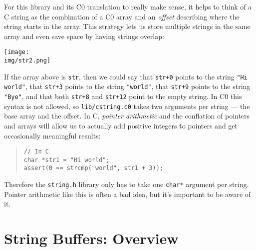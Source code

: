 \documentclass[12pt]{exam}
\begin{document}
For this library and its C0 translation to really make sense, it helps
to think of a C string as the combination of a C0 array and an
\emph{offset} describing where the string starts in the array. This
strategy lets us store multiple strings in the same array and even
save space by having strings overlap:
\begin{center}
\texttt{[image: \\img/str2.png]}
\end{center}
If the array above is \lstinline'str', then we could say that
\lstinline'str+0' points to the string \lstinline'"Hi world"', that
\lstinline'str+3' points to the string \lstinline'"world"', that
\lstinline'str+9' points to the string \lstinline'"Bye"', and that
both \lstinline'str+8' and \lstinline'str+12' point to the empty
string. In C0 this syntax is not allowed, so
\lstinline'lib/cstring.c0' takes two arguments per string --- the base
array and the offset. In C, \emph{pointer arithmetic} and the
conflation of pointers and arrays will allow us to actually add
positive integers to pointers and get occasionally meaningful results:
\begin{quote}
\begin{lstlisting}
// In C
char *str1 = "Hi world";
assert(0 == strcmp("world", str1 + 3));
\end{lstlisting}
\end{quote}
Therefore the \lstinline[deletekeywords={string}]'string.h' library
only has to take one \lstinline'char*' argument per string. Pointer
arithmetic like this is often a bad idea, but it's important to be
aware of it.


\section{String Buffers: Overview}
\label{sec:overview}
\end{document}
